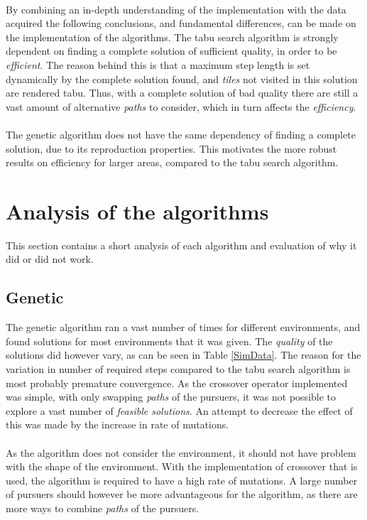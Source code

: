 \\By combining an in-depth understanding of the implementation with the data acquired the following conclusions, and fundamental differences, can be made on the implementation of the algorithms. The tabu search algorithm is strongly dependent on finding a complete solution of sufficient quality, in order to be \emph{efficient}. The reason behind this is that a maximum step length is set dynamically by the complete solution found, and \emph{tiles} not visited in this solution are rendered tabu. Thus, with a complete solution of bad quality there are still a vast amount of alternative \emph{paths} to consider, which in turn affects the \emph{efficiency}.\\
\\The genetic algorithm does not have the same dependency of finding a complete solution, due to its reproduction properties. This motivates the more robust results on efficiency for larger areas, compared to the tabu search algorithm. 
	
\section{Analysis of the algorithms}
This section contains a short analysis of each algorithm and evaluation of why it did or did not work.
\subsection{Genetic}
The genetic algorithm ran a vast number of times for different environments, and found solutions for most environments that it was given. The \emph{quality} of the solutions did however vary, as can be seen in Table \ref{SimData}. The reason for the variation in number of required steps compared to the tabu search algorithm is most probably premature convergence. As the crossover operator implemented was simple, with only swapping \emph{paths} of the pursuers, it was not possible to explore a vast number of \emph{feasible solutions}. An attempt to decrease the effect of this was made by the increase in rate of mutations.\\
\\As the algorithm does not consider the environment, it should not have problem with the shape of the environment. With the implementation of crossover that is used, the algorithm is required to have a high rate of mutations. A large number of pursuers should however be more advantageous for the algorithm, as there are more ways to combine \emph{paths} of the pursuers.
